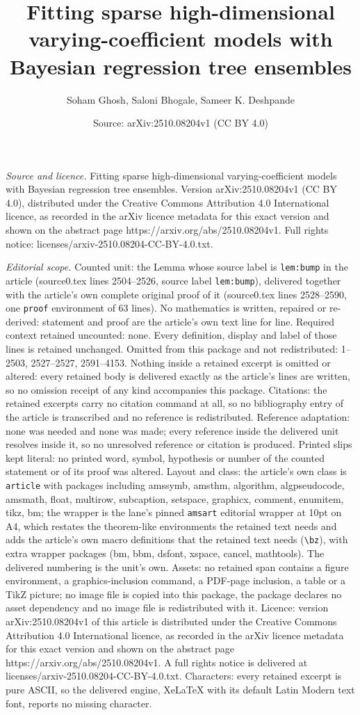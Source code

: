 \documentclass[10pt,a4paper]{amsart}
\title[Fitting sparse high-dimensional varying-coefficient models w]{Fitting sparse high-dimensional varying-coefficient models with Bayesian regression tree ensembles}
\author{Soham Ghosh, Saloni Bhogale, Sameer K. Deshpande}
\date{Source: arXiv:2510.08204v1 (CC BY 4.0)}
\begin{document}
\maketitle

\noindent\emph{Source and licence.} Fitting sparse high-dimensional varying-coefficient models with Bayesian regression tree ensembles. Version arXiv:2510.08204v1 (CC BY 4.0), distributed under the Creative Commons Attribution 4.0 International licence, as recorded in the arXiv licence metadata for this exact version and shown on the abstract page https://arxiv.org/abs/2510.08204v1. Full rights notice: licenses/arxiv-2510.08204-CC-BY-4.0.txt.\par\smallskip

\noindent\textit{Editorial scope.} Counted unit: the Lemma whose source label is \texttt{lem:bump} in the article (source0.tex lines 2504--2526, source label \texttt{lem:bump}), delivered together with the article's own complete original proof of it (source0.tex lines 2528--2590, one \texttt{proof} environment of 63 lines). No mathematics is written, repaired or re-derived: statement and proof are the article's own text line for line. Required context retained uncounted: none. Every definition, display and label of those lines is retained unchanged. Omitted from this package and not redistributed: 1--2503, 2527--2527, 2591--4153. Nothing inside a retained excerpt is omitted or altered: every retained body is delivered exactly as the article's lines are written, so no omission receipt of any kind accompanies this package. Citations: the retained excerpts carry no citation command at all, so no bibliography entry of the article is transcribed and no reference is redistributed. Reference adaptation: none was needed and none was made; every reference inside the delivered unit resolves inside it, so no unresolved reference or citation is produced. Printed slips kept literal: no printed word, symbol, hypothesis or number of the counted statement or of its proof was altered. Layout and class: the article's own class is \texttt{article} with packages including amssymb, amsthm, algorithm, algpseudocode, amsmath, float, multirow, subcaption, setspace, graphicx, comment, enumitem, tikz, bm; the wrapper is the lane's pinned \texttt{amsart} editorial wrapper at 10pt on A4, which restates the theorem-like environments the retained text needs and adds the article's own macro definitions that the retained text needs (\texttt{\textbackslash bz}), with extra wrapper packages (bm, bbm, dsfont, xspace, cancel, mathtools). The delivered numbering is the unit's own. Assets: no retained span contains a figure environment, a graphics-inclusion command, a PDF-page inclusion, a table or a TikZ picture; no image file is copied into this package, the package declares no asset dependency and no image file is redistributed with it. Licence: version arXiv:2510.08204v1 of this article is distributed under the Creative Commons Attribution 4.0 International licence, as recorded in the arXiv licence metadata for this exact version and shown on the abstract page https://arxiv.org/abs/2510.08204v1. A full rights notice is delivered at licenses/arxiv-2510.08204-CC-BY-4.0.txt. Characters: every retained excerpt is pure ASCII, so the delivered engine, XeLaTeX with its default Latin Modern text font, reports no missing character.
\end{document}
